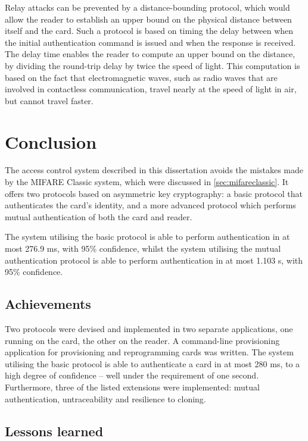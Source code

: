 \documentclass[12pt,a4paper,twoside,openright]{report}
\begin{document}
Relay attacks can be prevented by a distance-bounding protocol, which would allow the reader to establish an upper bound on the physical distance between itself and the card. Such a protocol is based on timing the delay between when the initial authentication command is issued and when the response is received. The delay time enables the reader to compute an upper bound on the distance, by dividing the round-trip delay by twice the speed of light. This computation is based on the fact that electromagnetic waves, such as radio waves that are involved in contactless communication, travel nearly at the speed of light in air, but cannot travel faster. 

\chapter{Conclusion}

The access control system described in this dissertation avoids the mistakes made by the MIFARE Classic system, which were discussed in \autoref{sec:mifareclassic}. It offers two protocols based on asymmetric key cryptography: a basic protocol that authenticates the card's identity, and a more advanced protocol which performs mutual authentication of both the card and reader.

The system utilising the basic protocol is able to perform authentication in at most 276.9 ms, with 95\% confidence, whilst the system utilising the mutual authentication protocol is able to perform authentication in at most 1.103 s, with 95\% confidence.

\section{Achievements}

Two protocols were devised and implemented in two separate applications, one running on the card, the other on the reader. A command-line provisioning application for provisioning and reprogramming cards was written. The system utilising the basic protocol is able to authenticate a card in at most 280 ms, to a high degree of confidence -- well under the requirement of one second. Furthermore, three of the listed extensions were implemented: mutual authentication, untraceability and resilience to cloning.

\section{Lessons learned}
\end{document}
